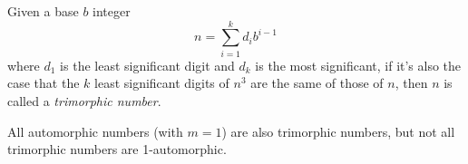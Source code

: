 \documentclass[12pt]{article}
\begin{document}
Given a base $b$ integer $$n = \sum_{i = 1}^k d_ib^{i - 1}$$ where $d_1$ is the least significant digit and $d_k$ is the most significant, if it's also the case that the $k$ least significant digits of $n^3$ are the same of those of $n$, then $n$ is called a {\em trimorphic number}.

All automorphic numbers (with $m = 1$) are also trimorphic numbers, but not all trimorphic numbers are 1-automorphic.
\end{document}
